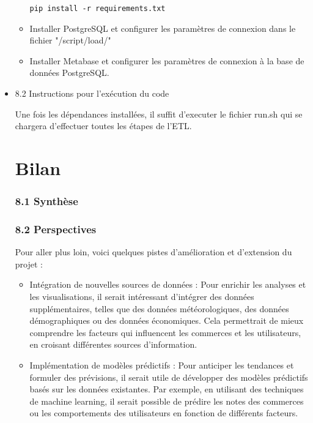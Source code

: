 \begin{itemize}
\begin{itemize}
\begin{verbatim}
pip install -r requirements.txt
\end{verbatim}

\item Installer PostgreSQL et configurer les paramètres de connexion dans le fichier "/script/load/"

\item Installer Metabase et configurer les paramètres de connexion à la base de données PostgreSQL.
\end{itemize}


\item 8.2 Instructions pour l’exécution du code

Une fois les dépendances installées, il suffit d'executer le fichier run.sh qui se chargera d'effectuer toutes les étapes de l'ETL.


\chapter*{Bilan}

\subsection{8.1 Synthèse}



\subsection{8.2 Perspectives}

Pour aller plus loin, voici quelques pistes d’amélioration et d’extension du projet :

\begin{itemize}

\item Intégration de nouvelles sources de données : Pour enrichir les analyses et les visualisations, il serait intéressant d’intégrer des données supplémentaires, telles que des données météorologiques, des données démographiques ou des données économiques.
Cela permettrait de mieux comprendre les facteurs qui influencent les commerces et les utilisateurs, en croisant différentes sources d’information.

\item Implémentation de modèles prédictifs : Pour anticiper les tendances et formuler des prévisions, il serait utile de développer des modèles prédictifs basés sur les données existantes.
Par exemple, en utilisant des techniques de machine learning, il serait possible de prédire les notes des commerces ou les comportements des utilisateurs en fonction de différents facteurs.


\end{itemize}
\end{itemize}
